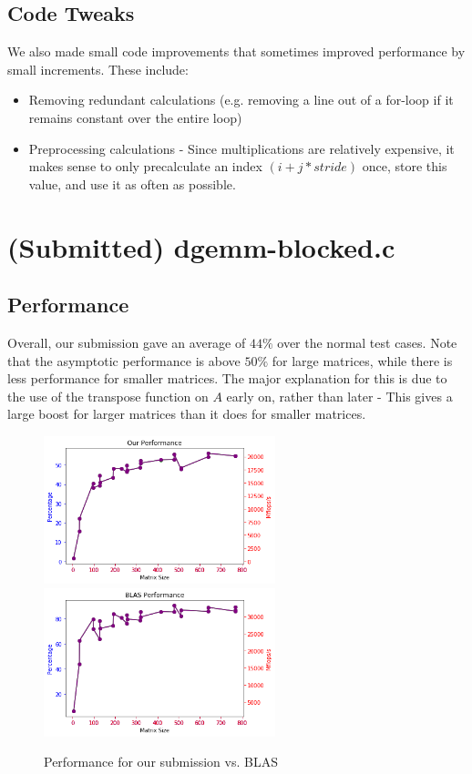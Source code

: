 \documentclass[12pt]{article}
\begin{document}
\subsection{Code Tweaks}
We also made small code improvements that sometimes improved performance by small increments. These include: 
\begin{itemize}
\item Removing redundant calculations (e.g. removing a line out of a for-loop if it remains constant over the entire loop)
\item Preprocessing calculations - Since multiplications are relatively expensive, it makes sense to only precalculate an index $(i +j* stride)$ once, store this value, and use it as often as possible. 
\end{itemize}


\section{(Submitted) dgemm-blocked.c }
\subsection{Performance}
Overall, our submission gave an average of $44 \%$ over the normal test cases. Note that the asymptotic performance is above $50 \%$ for large matrices, while there is less performance for smaller matrices. The major explanation for this is due to the use of the transpose function on $A$ early on, rather than later - This gives a large boost for larger matrices than it does for smaller matrices.    
\begin{figure}[h]
  \caption{Performance for our submission vs. BLAS}
  \centering
    \includegraphics[width=0.6\textwidth]{our_performance_graph.png}
     \includegraphics[width=0.6\textwidth]{blas_performance_graph.png}
\end{figure}
\end{document}
